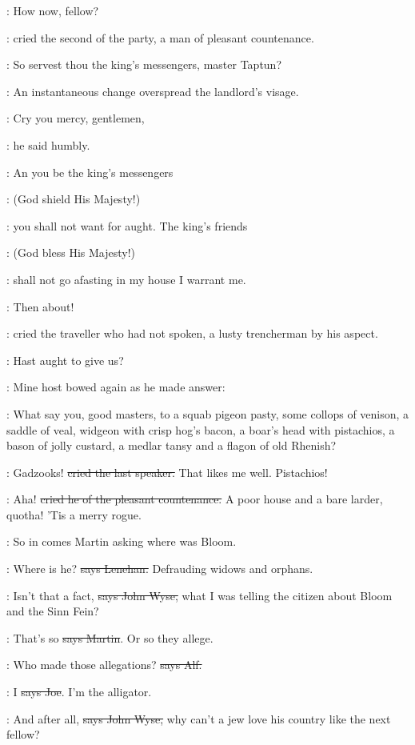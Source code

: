 \power:
How now, fellow?

:
cried the second of the party, a man of pleasant countenance.

\power:
So servest thou the king's messengers, master Taptun?

:
An instantaneous change overspread the landlord's visage.

\terry:
Cry you mercy, gentlemen,

:
he said humbly.

\terry:
An you be the king's messengers

:
(God shield His Majesty!)

\terry:
you shall not want for aught. The king's friends

:
(God bless His Majesty!)

\terry:
shall not go afasting in my house I warrant me.

\crofton:
Then about!

:
cried the traveller who had not spoken,
a lusty trencherman by his aspect.

\crofton:
Hast aught to give us?

:
Mine host bowed again as he made answer:

\terry:
What say you, good masters,
to a squab pigeon pasty, some collops of
venison, a saddle of veal, widgeon with crisp hog's bacon, a boar's head
with pistachios, a bason of jolly custard, a medlar tansy and a flagon of
old Rhenish?

\crofton:
Gadzooks! \sout{cried the last speaker.}
That likes me well. Pistachios!

\power:
Aha! \sout{cried he of the pleasant countenance.}
A poor house and a bare
larder, quotha!
'Tis a merry rogue.

\Nq:
So in comes Martin asking where was Bloom.

\lenehan:
Where is he? \sout{says Lenehan.}
Defrauding widows and orphans.

\johnwyse:
Isn't that a fact, \sout{says John Wyse,}
what I was telling the citizen about
Bloom and the Sinn Fein?

\cunningham:
That's so \sout{says Martin}.
Or so they allege.

\bergan:
Who made those allegations? \sout{says Alf.}

\joe:
I \sout{says Joe}. I'm the alligator.

\johnwyse:
And after all, \sout{says John Wyse,}
why can't a jew love his country like the
next fellow?

